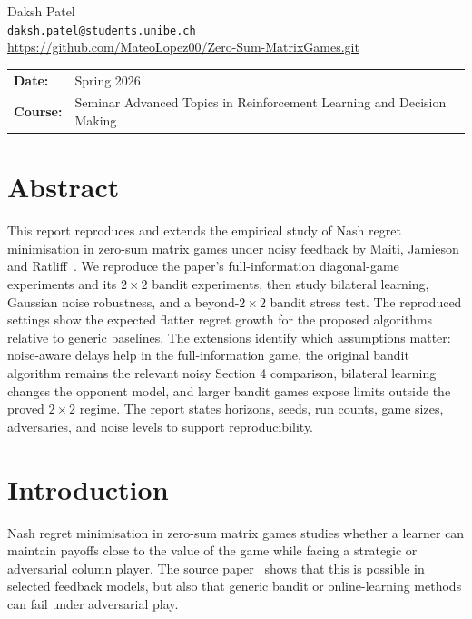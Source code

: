 \documentclass[a4paper,11pt]{article}
\theoremstyle{definition}
\begin{document}
\begin{titlepage}
\begin{center}
{\large Daksh Patel}\\[-0.02cm]
{\normalsize \texttt{daksh.patel@students.unibe.ch}}\\[0.65cm]

{\small \url{https://github.com/MateoLopez00/Zero-Sum-MatrixGames.git}}
\end{center}

\vfill

\noindent
\begin{tabular}{@{}p{}p{}@{}}
\textbf{Date:} & Spring 2026 \\[0.10cm]
\textbf{Course:} & Seminar Advanced Topics in Reinforcement Learning and Decision Making \\[0.10cm]
\end{tabular}

\restoregeometry
\end{titlepage}

\pagestyle{plain}

\section*{Abstract}

This report reproduces and extends the empirical study of Nash regret minimisation in zero-sum matrix games under noisy feedback by Maiti, Jamieson and Ratliff~\cite{maiti2023nashregret}. We reproduce the paper's full-information diagonal-game experiments and its $2\times2$ bandit experiments, then study bilateral learning, Gaussian noise robustness, and a beyond-$2\times2$ bandit stress test. The reproduced settings show the expected flatter regret growth for the proposed algorithms relative to generic baselines. The extensions identify which assumptions matter: noise-aware delays help in the full-information game, the original bandit algorithm remains the relevant noisy Section 4 comparison, bilateral learning changes the opponent model, and larger bandit games expose limits outside the proved $2\times2$ regime. The report states horizons, seeds, run counts, game sizes, adversaries, and noise levels to support reproducibility.

\section{Introduction}

Nash regret minimisation in zero-sum matrix games studies whether a learner can maintain payoffs close to the value of the game while facing a strategic or adversarial column player. The source paper~\cite{maiti2023nashregret} shows that this is possible in selected feedback models, but also that generic bandit or online-learning methods can fail under adversarial play.
\end{document}
